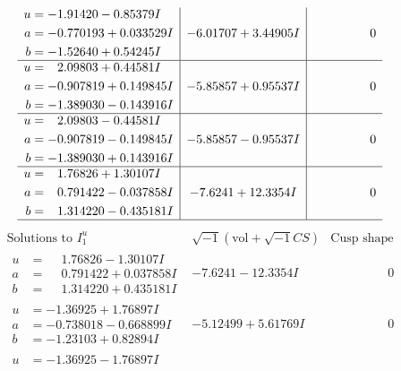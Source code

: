 \documentclass[1p]{elsarticle_modified}
\theoremstyle{definition}
\newcommand{\I}{\sqrt{-1}}
\begin{document}
$$\begin{array}{c|c|c}
\begin{aligned}
u &= -1.91420 - 0.85379 I \\
a &= -0.770193 + 0.033529 I \\
b &= -1.52640 + 0.54245 I\end{aligned}
 & -6.01707 + 3.44905 I & \phantom{-0.000000 } 0 \\ \hline\begin{aligned}
u &= \phantom{-}2.09803 + 0.44581 I \\
a &= -0.907819 + 0.149845 I \\
b &= -1.389030 - 0.143916 I\end{aligned}
 & -5.85857 + 0.95537 I & \phantom{-0.000000 } 0 \\ \hline\begin{aligned}
u &= \phantom{-}2.09803 - 0.44581 I \\
a &= -0.907819 - 0.149845 I \\
b &= -1.389030 + 0.143916 I\end{aligned}
 & -5.85857 - 0.95537 I & \phantom{-0.000000 } 0 \\ \hline\begin{aligned}
u &= \phantom{-}1.76826 + 1.30107 I \\
a &= \phantom{-}0.791422 - 0.037858 I \\
b &= \phantom{-}1.314220 - 0.435181 I\end{aligned}
 & -7.6241 + 12.3354 I & \phantom{-0.000000 } 0\\
 \hline 
 \end{array}$$\newpage$$\begin{array}{c|c|c}  
\text{Solutions to }I^u_{1}& \I (\text{vol} + \sqrt{-1}CS) & \text{Cusp shape}\\
 \hline 
\begin{aligned}
u &= \phantom{-}1.76826 - 1.30107 I \\
a &= \phantom{-}0.791422 + 0.037858 I \\
b &= \phantom{-}1.314220 + 0.435181 I\end{aligned}
 & -7.6241 - 12.3354 I & \phantom{-0.000000 } 0 \\ \hline\begin{aligned}
u &= -1.36925 + 1.76897 I \\
a &= -0.738018 - 0.668899 I \\
b &= -1.23103 + 0.82894 I\end{aligned}
 & -5.12499 + 5.61769 I & \phantom{-0.000000 } 0 \\ \hline\begin{aligned}
u &= -1.36925 - 1.76897 I \\

\end{aligned}
\end{array}$$
\end{document}
